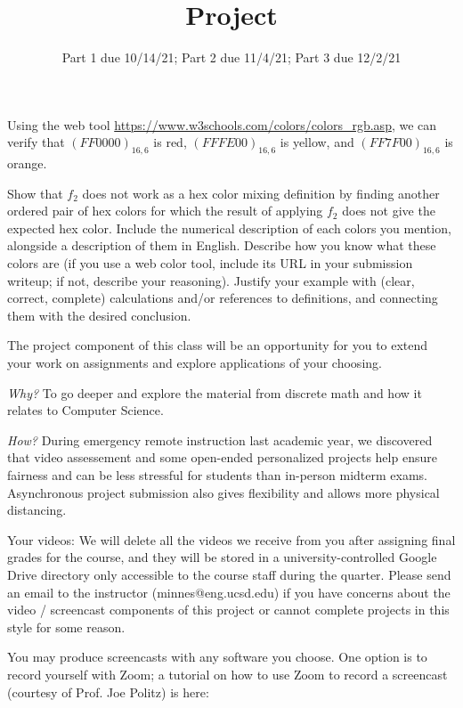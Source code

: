 \documentclass[12pt, oneside]{article}
\begin{document}
\begin{enumerate}[labelindent=0pt, leftmargin=0pt]
\begin{enumerate}
Using the web tool \url{https://www.w3schools.com/colors/colors_rgb.asp}, we can verify that $(FF0000)_{16,6}$ is red, 
$(FFFE00)_{16,6}$ is yellow, and $(FF7F00)_{16,6}$ is orange.

Show that $f_2$ does not work as a hex color mixing definition by finding
another ordered pair of hex colors for which the result of applying $f_2$ does not give the expected hex color.
Include the numerical description of each colors you mention, alongside a description of them in English. 
Describe how you know what these colors are
(if you use a web color tool, include its URL in your submission writeup; if not, describe your reasoning).
Justify your 
example with (clear, correct, complete) calculations and/or references to definitions, and connecting them with
the desired conclusion.
\end{enumerate}
\end{enumerate}
\newpage

\title{Project}
\date{Part 1 due 10/14/21; Part 2 due 11/4/21; Part 3 due 12/2/21}


\maketitle
\thispagestyle{fancy}
The project component of this class will be an opportunity for you to extend your 
work on assignments and explore applications of your choosing. 

{\it Why?}
To go deeper and explore the material from discrete math and how it relates to Computer Science.

{\it How?} During emergency remote instruction last academic year, we discovered
that video assessement and some open-ended personalized projects help ensure fairness
and can be less stressful for students than in-person midterm exams. Asynchronous project
submission also gives flexibility and allows more physical distancing.

Your videos: We will delete all the videos we receive from you after assigning final grades for the course, 
and they will be stored in a university-controlled Google Drive directory 
only accessible to the course staff during the quarter. 
Please send an email to the instructor (minnes@eng.ucsd.edu) if you have 
concerns about 
the video / screencast components of this project or cannot complete projects in this style for some reason.

You may produce screencasts with any software you choose. 
One option is to record yourself with Zoom; a tutorial on how to use Zoom to record a 
screencast (courtesy of Prof. Joe Politz)  is here: 
\end{document}
